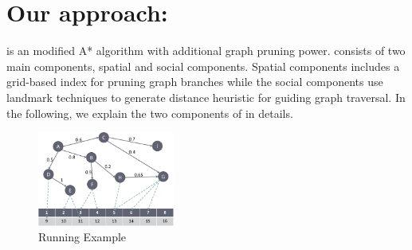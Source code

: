\section{Our approach: {\orirrp}} \label{sec:solution}
{\rrp} is an modified A* algorithm with additional graph pruning power. {\rrp} consists of two main components, spatial and social components. Spatial components includes a grid-based index for pruning graph branches while the social components use landmark techniques to generate distance heuristic for guiding graph traversal. In the following, we explain the two components of {\rrp} in details.


\begin{figure}[t]
	\centering \includegraphics[width=0.40\textwidth]{images/space_partitioned_world.eps}
    \caption{Running Example}
    \label{fig:running-example-solution}
\end{figure}


